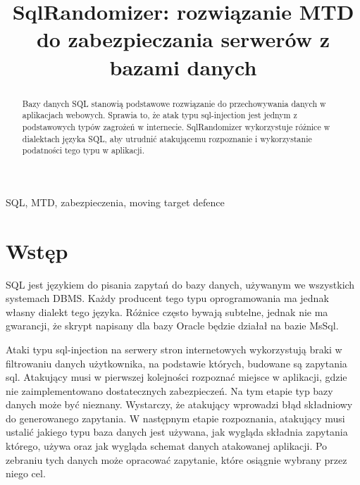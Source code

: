 \documentclass[conference]{IEEEtran}
\begin{document}
\title{SqlRandomizer: rozwiązanie MTD do zabezpieczania serwerów z bazami danych}

\author{
\and
{}
}

\maketitle

\begin{abstract}
Bazy danych SQL stanowią podstawowe rozwiązanie do przechowywania danych w aplikacjach webowych.
Sprawia to, że atak typu sql-injection jest jednym z podstawowych typów zagrożeń w internecie.
SqlRandomizer wykorzystuje różnice w dialektach języka SQL, aby utrudnić atakującemu rozpoznanie i wykorzystanie podatności tego typu w aplikacji.


\end{abstract}

\begin{IEEEkeywords}
SQL, MTD, zabezpieczenia, moving target defence
\end{IEEEkeywords}

\section{Wstęp}

SQL jest językiem do pisania zapytań do bazy danych, używanym we wszystkich systemach DBMS.
Każdy producent tego typu oprogramowania ma jednak własny dialekt tego języka.
Różnice często bywają subtelne, jednak nie ma gwarancji, że skrypt napisany dla bazy Oracle będzie działał na bazie MsSql.

Ataki typu sql-injection na serwery stron internetowych wykorzystują braki w filtrowaniu danych użytkownika, na podstawie których, budowane są zapytania sql.
Atakujący musi w pierwszej kolejności rozpoznać miejsce w aplikacji, gdzie nie zaimplementowano dostatecznych zabezpieczeń.
Na tym etapie typ bazy danych może być nieznany.
Wystarczy, że atakujący wprowadzi błąd składniowy do generowanego zapytania.
W następnym etapie rozpoznania, atakujący musi ustalić jakiego typu baza danych jest używana, jak wygląda składnia zapytania którego, używa oraz jak wygląda schemat danych atakowanej aplikacji.
Po zebraniu tych danych może opracować zapytanie, które osiągnie wybrany przez niego cel.
\end{document}
